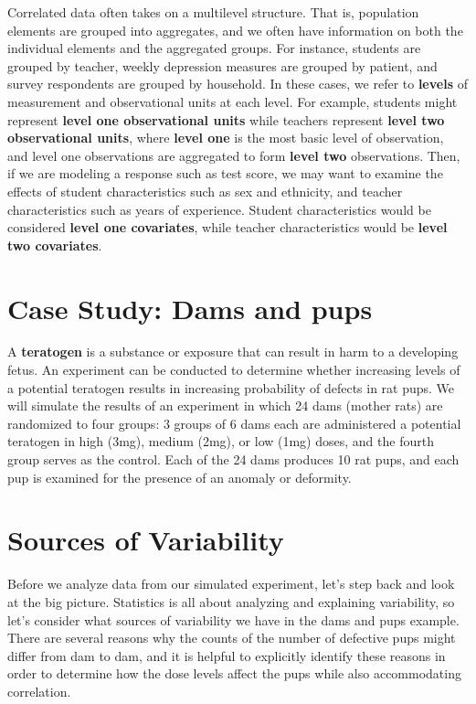 \documentclass[
]{krantz}
\begin{document}
Correlated data often takes on a multilevel structure. That is, population elements are grouped into aggregates, and we often have information on both the individual elements and the aggregated groups. For instance, students are grouped by teacher, weekly depression measures are grouped by patient, and survey respondents are grouped by household. In these cases, we refer to \textbf{levels} of measurement and observational units at each level. For example, students might represent \textbf{level one observational units} while teachers represent \textbf{level two observational units}, where \textbf{level one} is the most basic level of observation, and level one observations are aggregated to form \textbf{level two} observations. Then, if we are modeling a response such as test score, we may want to examine the effects of student characteristics such as sex and ethnicity, and teacher characteristics such as years of experience. Student characteristics would be considered \textbf{level one covariates}, while teacher characteristics would be \textbf{level two covariates}.

\hypertarget{case-study-dams-and-pups}{%
\section{Case Study: Dams and pups}\label{case-study-dams-and-pups}}

A \textbf{teratogen} is a substance or exposure that can result in harm to a developing fetus. An experiment can be conducted to determine whether increasing levels of a potential teratogen results in increasing probability of defects in rat pups. We will simulate the results of an experiment in which 24 dams (mother rats) are randomized to four groups: 3 groups of 6 dams each are administered a potential teratogen in high (3mg), medium (2mg), or low (1mg) doses, and the fourth group serves as the control. Each of the 24 dams produces 10 rat pups, and each pup is examined for the presence of an anomaly or deformity.

\hypertarget{sources-of-variability}{%
\section{Sources of Variability}\label{sources-of-variability}}

Before we analyze data from our simulated experiment, let's step back and look at the big picture. Statistics is all about analyzing and explaining variability, so let's consider what sources of variability we have in the dams and pups example. There are several reasons why the counts of the number of defective pups might differ from dam to dam, and it is helpful to explicitly identify these reasons in order to determine how the dose levels affect the pups while also accommodating correlation.
\end{document}
